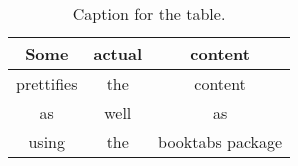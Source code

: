 \documentclass{article}
\begin{document}
\begin{table}[h!]
	\centering
	\caption{Caption for the table.}
	\label{tab:table1}
	\begin{tabular}{ccc}
		\toprule
		Some & actual & content\\
		\midrule
		prettifies & the & content\\
		as & well & as\\
		using & the & booktabs package\\
		\bottomrule
	\end{tabular}
\end{table}
\end{document}
